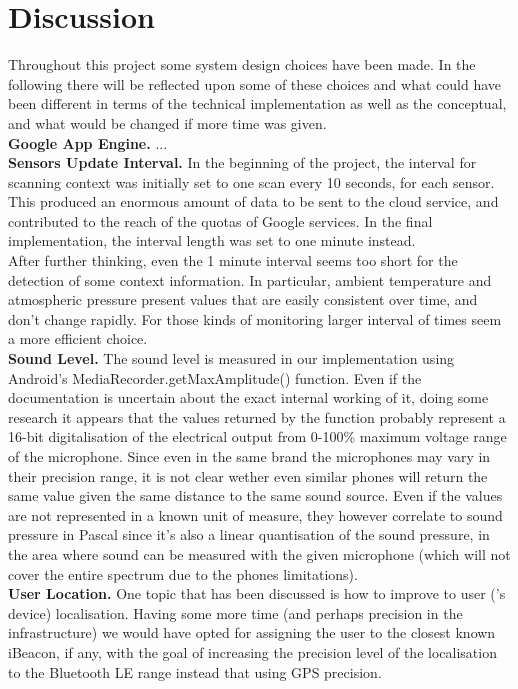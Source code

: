 \section{Discussion}
Throughout this project some system design choices have
been made. In the following there will be reflected upon some of these choices and 
what could have been different in terms of the technical implementation
 as well as the conceptual, and what would be
changed if more time was given. \\

\textbf{Google App Engine. }
...
\\
\textbf{Sensors Update Interval. } 
In the beginning of the project, the interval for scanning context was initially set to one scan every 10 seconds, for each sensor. This produced an enormous amount of data to be sent to the cloud service, and contributed to the reach of the quotas of Google services.
In the final implementation, the interval length was set to one minute instead.\\ After further thinking, even the 1 minute interval seems too short for the detection of some context information. In particular, ambient temperature and atmospheric pressure present values that are easily consistent over time, and don't change rapidly. For those kinds of monitoring larger interval of times seem a more efficient choice.
\\
\textbf{Sound Level. }
The sound level is measured in our implementation using Android's MediaRecorder.getMaxAmplitude() function.
Even if the documentation is uncertain about the exact internal working of it, doing some research it appears that the values returned by the function probably represent a 16-bit digitalisation of the electrical output from 0-100\% maximum voltage range of the microphone. Since even in the same brand the microphones may vary in their precision range, it is  not clear wether even similar phones will return the same value given the same distance to the same sound source.
Even if the values are not represented in a known unit of measure, they however correlate to sound pressure in Pascal since it's also a linear quantisation of the sound pressure, in the area where sound can be measured with the given microphone (which will not cover the entire spectrum due to the phones limitations).
\\
\textbf{User Location. }
One topic that has been discussed is how to improve to user ('s device) localisation. Having some more time (and perhaps precision in the infrastructure) we would have opted for assigning the user to the closest known iBeacon, if any, with the goal of increasing the precision level of the localisation to the Bluetooth LE range instead that using GPS precision.




